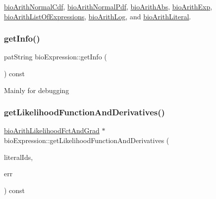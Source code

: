 \hyperlink{classbio_arith_normal_cdf_a2e5b58ae0d8b71d2129e7f44ff9c647e}{bio\+Arith\+Normal\+Cdf}, \hyperlink{classbio_arith_normal_pdf_af63b696ee818be0597345caf08d0b3d1}{bio\+Arith\+Normal\+Pdf}, \hyperlink{classbio_arith_abs_a52f933907c3b7e246228297d1ac253ef}{bio\+Arith\+Abs}, \hyperlink{classbio_arith_exp_a3bf86cc33d7879bdf4e9e420890f6851}{bio\+Arith\+Exp}, \hyperlink{classbio_arith_list_of_expressions_ac6a8b9493bc91520a1882df3cddc383d}{bio\+Arith\+List\+Of\+Expressions}, \hyperlink{classbio_arith_log_a5deea723cf9e2b50dc4f6c61a6b82090}{bio\+Arith\+Log}, and \hyperlink{classbio_arith_literal_ab75046eaffcb688b83031da7f91653f9}{bio\+Arith\+Literal}.

\mbox{\label{classbio_expression_aef7f12e945c110c84918b7af6c819c7f}} 
\subsubsection{\texorpdfstring{get\+Info()}{getInfo()}}
{\footnotesize\ttfamily pat\+String bio\+Expression\+::get\+Info (\begin{DoxyParamCaption}{ }\end{DoxyParamCaption}) const\hspace{0.3cm}{\ttfamily [virtual]}}

Mainly for debugging \mbox{\label{classbio_expression_a30e6b5a6363c93af4aa8ce7a42be6e65}} 
\subsubsection{\texorpdfstring{get\+Likelihood\+Function\+And\+Derivatives()}{getLikelihoodFunctionAndDerivatives()}}
{\footnotesize\ttfamily \hyperlink{classbio_arith_likelihood_fct_and_grad}{bio\+Arith\+Likelihood\+Fct\+And\+Grad} $\ast$ bio\+Expression\+::get\+Likelihood\+Function\+And\+Derivatives (\begin{DoxyParamCaption}\item[{vector$<$ pat\+U\+Long $>$}]{literal\+Ids,  }\item[{pat\+Error $\ast$\&}]{err }\end{DoxyParamCaption}) const\hspace{0.3cm}{\ttfamily [virtual]}}


